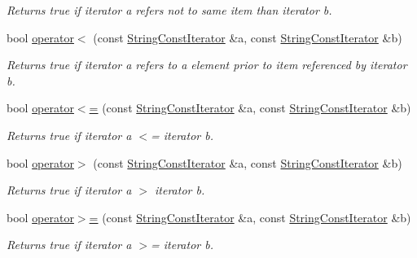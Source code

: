\begin{DoxyCompactItemize}
\begin{DoxyCompactList}\small\item\em Returns true if iterator a refers not to same item than iterator b. \end{DoxyCompactList}\item 
bool \hyperlink{struct_mdt_1_1_plain_text_1_1_string_const_iterator_ab6c41706a2c62f0e6517c305311b33f0}{operator$<$} (const \hyperlink{struct_mdt_1_1_plain_text_1_1_string_const_iterator}{String\+Const\+Iterator} \&a, const \hyperlink{struct_mdt_1_1_plain_text_1_1_string_const_iterator}{String\+Const\+Iterator} \&b)
\begin{DoxyCompactList}\small\item\em Returns true if iterator a refers to a element prior to item referenced by iterator b. \end{DoxyCompactList}\item 
bool \hyperlink{struct_mdt_1_1_plain_text_1_1_string_const_iterator_a4873d7ea38532347f34f5972aa869d0d}{operator$<$=} (const \hyperlink{struct_mdt_1_1_plain_text_1_1_string_const_iterator}{String\+Const\+Iterator} \&a, const \hyperlink{struct_mdt_1_1_plain_text_1_1_string_const_iterator}{String\+Const\+Iterator} \&b)
\begin{DoxyCompactList}\small\item\em Returns true if iterator a $<$= iterator b. \end{DoxyCompactList}\item 
bool \hyperlink{struct_mdt_1_1_plain_text_1_1_string_const_iterator_a4ecb4b8bf38c6c9f73cab3376f30ddbc}{operator$>$} (const \hyperlink{struct_mdt_1_1_plain_text_1_1_string_const_iterator}{String\+Const\+Iterator} \&a, const \hyperlink{struct_mdt_1_1_plain_text_1_1_string_const_iterator}{String\+Const\+Iterator} \&b)
\begin{DoxyCompactList}\small\item\em Returns true if iterator a $>$ iterator b. \end{DoxyCompactList}\item 
bool \hyperlink{struct_mdt_1_1_plain_text_1_1_string_const_iterator_aa84a37a77a95607eb3d645a607e50831}{operator$>$=} (const \hyperlink{struct_mdt_1_1_plain_text_1_1_string_const_iterator}{String\+Const\+Iterator} \&a, const \hyperlink{struct_mdt_1_1_plain_text_1_1_string_const_iterator}{String\+Const\+Iterator} \&b)
\begin{DoxyCompactList}\small\item\em Returns true if iterator a $>$= iterator b. \end{DoxyCompactList}\end{DoxyCompactItemize}


